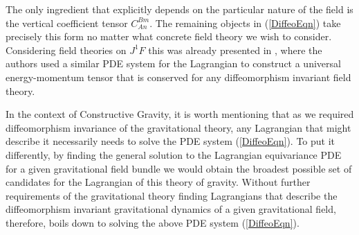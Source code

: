 The only ingredient that explicitly depends on the particular nature of the field is the vertical coefficient tensor $C^{Bm}_{An}$.
The remaining objects in (\ref{DiffeoEqn}) take precisely this form no matter what concrete field theory we wish to consider.
Considering field theories on $J^1F$ this was already presented in \cite{Gotay1992StressEnergyMomentumTA}, where the authors used a similar PDE system for the Lagrangian to construct a universal energy-momentum tensor that is conserved for any diffeomorphism invariant field theory.

In the context of Constructive Gravity, it is worth mentioning that as we required diffeomorphism invariance of the gravitational theory, any Lagrangian that might describe it necessarily needs to solve the PDE system (\ref{DiffeoEqn}). To put it differently, by finding the general solution to the Lagrangian equivariance PDE for a given gravitational field bundle we would obtain the broadest possible set of candidates for the Lagrangian of this theory of gravity. Without further requirements of the gravitational theory finding Lagrangians that describe the diffeomorphism invariant gravitational dynamics of a given gravitational field, therefore, boils down to solving the above PDE system (\ref{DiffeoEqn}). 

